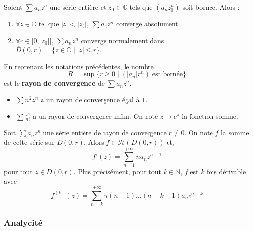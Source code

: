   \begin{lemma}
    Soient $\sum a_n z^n$ une série entière et $z_0 \in \mathbb{C}$ tels que $(a_n z_0^n)$ soit bornée. Alors :
    \begin{enumerate}[label={\bfseries(\roman*)}]
      \item $\forall z \in \mathbb{C}$ tel que $|z| < |z_0|$, $\sum a_n z^n$ converge absolument.
      \item $\forall r \in ]0,|z_0|[, \, \sum a_n z^n$ converge normalement dans $\overline{D}(0, r) = \{ z \in \mathbb{C} \mid |z| \leq r \}$.
    \end{enumerate}
  \end{lemma}

  \begin{definition}
    En reprenant les notations précédentes, le nombre
    \[ R = \sup \{ r \geq 0 \mid (|a_n|r^n) \text{ est bornée} \} \]
    est le \textbf{rayon de convergence} de $\sum a_n z^n$.
  \end{definition}


  \begin{example}
    \begin{itemize}
      \item $\sum n^2 z^n$ a un rayon de convergence égal à $1$.
      \item $\sum \frac{z^n}{n!}$ a un rayon de convergence infini. On note $z \mapsto e^z$ la fonction somme.
    \end{itemize}
  \end{example}


  \begin{proposition}
    Soit $\sum a_n z^n$ une série entière de rayon de convergence $r \neq 0$. On note $f$ la somme de cette série sur $D(0,r)$. Alors $f \in \mathcal{H}(D(0, r))$ et,
    \[ f'(z) = \sum_{n=1}^{+\infty} n a_n z^{n-1} \]
    pour tout $z \in D(0, r)$.
    \newpar
    Plus précisément, pour tout $k \in \mathbb{N}$, $f$ est $k$ fois dérivable avec
    \[ f^{(k)}(z) = \sum_{n=k}^{+\infty} n (n-1) \dots (n-k+1) a_n z^{n-k} \]
  \end{proposition}

  \subsubsection{Analycité}


